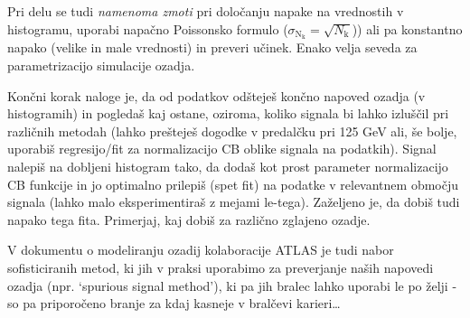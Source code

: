 \documentclass[slovene,11pt,a4paper]{article}
\begin{document}
Pri delu se tudi \emph{namenoma zmoti} pri določanju napake na vrednostih v histogramu, uporabi napačno Poissonsko formulo ($\sigma_{\mathrm{N_k}}=\sqrt{N_\mathrm{k}}$)) ali pa konstantno napako (velike in male vrednosti) in preveri učinek. Enako velja seveda za parametrizacijo simulacije ozadja.

Končni korak naloge je, da od podatkov odšteješ končno napoved ozadja (v histogramih) in pogledaš kaj ostane, oziroma, koliko signala bi lahko izluščil pri različnih metodah (lahko prešteješ dogodke v predalčku pri 125 GeV ali, še bolje, uporabiš regresijo/fit za normalizacijo CB oblike signala na podatkih). Signal nalepiš na dobljeni histogram tako, da dodaš kot prost parameter normalizacijo CB funkcije in jo optimalno prilepiš (spet fit) na podatke v relevantnem območju signala (lahko malo eksperimentiraš z mejami le-tega). Zaželjeno je, da dobiš tudi napako tega fita. Primerjaj, kaj dobiš za različno zglajeno ozadje.

V dokumentu o modeliranju ozadij kolaboracije ATLAS \cite{atlas-bkg} je tudi nabor sofisticiranih metod, ki jih v praksi uporabimo za preverjanje naših napovedi ozadja (npr. `spurious signal method'), ki pa jih bralec lahko uporabi le po želji - so pa priporočeno branje za kdaj kasneje v bralčevi karieri\ldots
\end{document}
